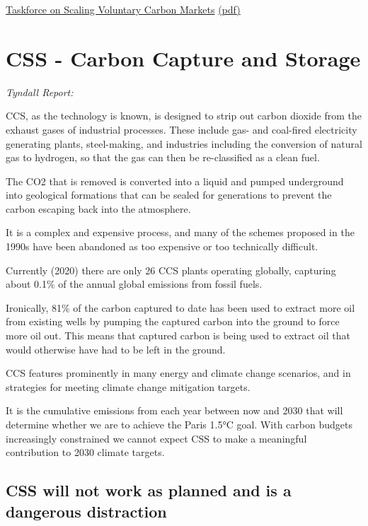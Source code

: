 \documentclass[
]{book}
\begin{document}
\href{https://www.iif.com/tsvcm}{Taskforce on Scaling Voluntary Carbon Markets}
\href{pdf/TSVCM_2021_Scaling_Carbon_Markets.pdf}{(pdf)}

\hypertarget{css---carbon-capture-and-storage}{%
\chapter{CSS - Carbon Capture and Storage}\label{css---carbon-capture-and-storage}}

\emph{Tyndall Report:}

CCS, as the technology is known, is designed to
strip out carbon dioxide from the exhaust gases of industrial processes.
These include gas- and coal-fired electricity generating plants, steel-making,
and industries including the conversion of natural gas to hydrogen,
so that the gas can then be re-classified as a clean fuel.

The CO2 that is removed is converted into a liquid and pumped underground
into geological formations that can be sealed for generations
to prevent the carbon escaping back into the atmosphere.

It is a complex and expensive process, and many of the schemes proposed in the 1990s
have been abandoned as too expensive or too technically difficult.

Currently (2020) there are only 26 CCS plants operating globally,
capturing about 0.1\% of the annual global emissions from fossil fuels.

Ironically, 81\% of the carbon captured to date has been used to
extract more oil from existing wells by pumping the captured carbon into the ground
to force more oil out.
This means that captured carbon is being used to extract oil that
would otherwise have had to be left in the ground.

CCS features prominently in many energy and climate change scenarios,
and in strategies for meeting climate change mitigation targets.

It is the cumulative emissions from each year between now and 2030 that will
determine whether we are to achieve the Paris 1.5°C goal.
With carbon budgets increasingly constrained we cannot expect
CSS to make a meaningful contribution to 2030 climate targets.

\hypertarget{css-will-not-work-as-planned-and-is-a-dangerous-distraction}{%
\section{CSS will not work as planned and is a dangerous distraction}\label{css-will-not-work-as-planned-and-is-a-dangerous-distraction}}
\end{document}
